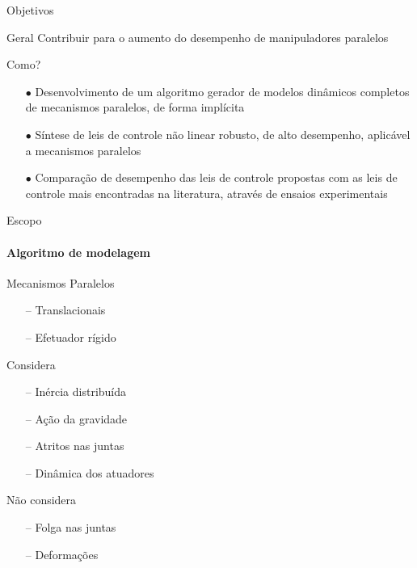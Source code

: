 \documentclass[25pt,landscape]{beamer}
\begin{document}
\begin{frame}{Objetivos}
	\pause
	\begin{block}{Geral}
		Contribuir para o aumento do desempenho de manipuladores paralelos
	\end{block}
	\pause
	\begin{exampleblock}{Como?}
		\pause
		\begin{itemize}
			\item[$\bullet$] Desenvolvimento de um algoritmo gerador de modelos din\^amicos completos de mecanismos paralelos, de forma impl\'icita \\[8pt]
			\pause
			\item[$\bullet$] S\'intese de leis de controle  n\~ao linear robusto, de alto desempenho, aplic\'avel a mecanismos paralelos \\[8pt]
			\pause
			\item[$\bullet$] Compara\c{c}\~ao de desempenho das leis de controle propostas com as leis de controle mais encontradas na literatura, atrav\'es de ensaios experimentais \\[8pt]
		\end{itemize}
	\end{exampleblock}
\end{frame}

\begin{frame}{Escopo}
    \framesubtitle{Algoritmo de modelagem}
    \pause
    \begin{block}{Mecanismos Paralelos}
        \begin{itemize}
            \item[--] Translacionais \\[4pt]
            \item[--] Efetuador r\'igido \\[4pt]
        \end{itemize}
    \end{block}
    \pause
    \begin{block}{Considera}
        \begin{itemize}
            \item[--] In\'ercia distribu\'ida \\[4pt]
            \item[--] A\c{c}\~ao da gravidade \\[4pt]
            \item[--] Atritos nas juntas \\[4pt]
            \item[--] Din\^amica dos atuadores \\[4pt]
        \end{itemize}
    \end{block}
    \pause
    \begin{block}{N\~ao considera}
        \begin{itemize}
            \item[--] Folga nas juntas \\[4pt]
            \item[--] Deforma\c{c}\~oes \\[4pt]
        \end{itemize}
    \end{block}
\end{frame}
\end{document}

